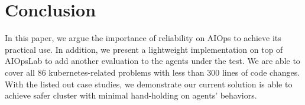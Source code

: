 \section{Conclusion}

In this paper, we argue the importance of reliability on AIOps to achieve its practical use. In addition, we present a lightweight implementation on top of AIOpsLab to add another evaluation to the agents under the test. We are able to cover all 86 kubernetes-related problems with less than 300 lines of code changes. With the listed out case studies, we demonstrate our current solution is able to achieve safer cluster with minimal hand-holding on agents' behaviors.